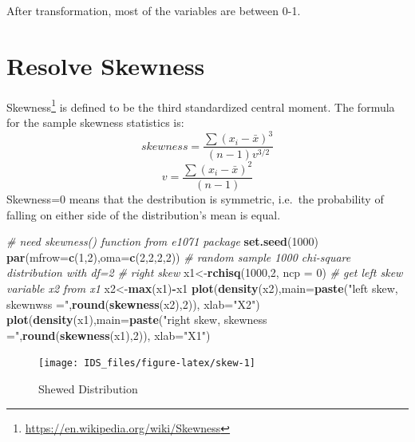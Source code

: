 \documentclass[12pt,]{krantz}
\newenvironment{Shaded}{\begin{snugshade}}{\end{snugshade}}
\newcommand{\KeywordTok}[1]{\textcolor[rgb]{0.13,0.29,0.53}{\textbf{#1}}}
\newcommand{\DataTypeTok}[1]{\textcolor[rgb]{0.13,0.29,0.53}{#1}}
\newcommand{\DecValTok}[1]{\textcolor[rgb]{0.00,0.00,0.81}{#1}}
\newcommand{\StringTok}[1]{\textcolor[rgb]{0.31,0.60,0.02}{#1}}
\newcommand{\CommentTok}[1]{\textcolor[rgb]{0.56,0.35,0.01}{\textit{#1}}}
\newcommand{\OperatorTok}[1]{\textcolor[rgb]{0.81,0.36,0.00}{\textbf{#1}}}
\newcommand{\NormalTok}[1]{#1}
\renewcommand{\href}[2]{#2\footnote{\url{#1}}}
\theoremstyle{definition}
\theoremstyle{definition}
\theoremstyle{definition}
\theoremstyle{remark}
\begin{document}
After transformation, most of the variables are between 0-1.

\section{Resolve Skewness}\label{resolve-skewness}

\href{https://en.wikipedia.org/wiki/Skewness}{Skewness} is defined to be
the third standardized central moment. The formula for the sample
skewness statistics is:
\[ skewness=\frac{\sum(x_{i}-\bar{x})^{3}}{(n-1)v^{3/2}}\]
\[v=\frac{\sum(x_{i}-\bar{x})^{2}}{(n-1)}\] Skewness=0 means that the
destribution is symmetric, i.e.~the probability of falling on either
side of the distribution's mean is equal.

\begin{Shaded}
\begin{Highlighting}[]
\CommentTok{# need skewness() function from e1071 package}
\KeywordTok{set.seed}\NormalTok{(}\DecValTok{1000}\NormalTok{)}
\KeywordTok{par}\NormalTok{(}\DataTypeTok{mfrow=}\KeywordTok{c}\NormalTok{(}\DecValTok{1}\NormalTok{,}\DecValTok{2}\NormalTok{),}\DataTypeTok{oma=}\KeywordTok{c}\NormalTok{(}\DecValTok{2}\NormalTok{,}\DecValTok{2}\NormalTok{,}\DecValTok{2}\NormalTok{,}\DecValTok{2}\NormalTok{))}
\CommentTok{# random sample 1000 chi-square distribution with df=2}
\CommentTok{# right skew}
\NormalTok{x1<-}\KeywordTok{rchisq}\NormalTok{(}\DecValTok{1000}\NormalTok{,}\DecValTok{2}\NormalTok{, }\DataTypeTok{ncp =} \DecValTok{0}\NormalTok{)}
\CommentTok{# get left skew variable x2 from x1}
\NormalTok{x2<-}\KeywordTok{max}\NormalTok{(x1)}\OperatorTok{-}\NormalTok{x1}
\KeywordTok{plot}\NormalTok{(}\KeywordTok{density}\NormalTok{(x2),}\DataTypeTok{main=}\KeywordTok{paste}\NormalTok{(}\StringTok{"left skew, skewnwss ="}\NormalTok{,}\KeywordTok{round}\NormalTok{(}\KeywordTok{skewness}\NormalTok{(x2),}\DecValTok{2}\NormalTok{)), }\DataTypeTok{xlab=}\StringTok{"X2"}\NormalTok{)}
\KeywordTok{plot}\NormalTok{(}\KeywordTok{density}\NormalTok{(x1),}\DataTypeTok{main=}\KeywordTok{paste}\NormalTok{(}\StringTok{"right skew, skewness ="}\NormalTok{,}\KeywordTok{round}\NormalTok{(}\KeywordTok{skewness}\NormalTok{(x1),}\DecValTok{2}\NormalTok{)), }\DataTypeTok{xlab=}\StringTok{"X1"}\NormalTok{)}
\end{Highlighting}
\end{Shaded}

\begin{figure}

{\centering \texttt{[image: IDS\_files/figure-latex/skew-1]} 

}

\caption{Shewed Distribution}\label{fig:skew}
\end{figure}
\end{document}
